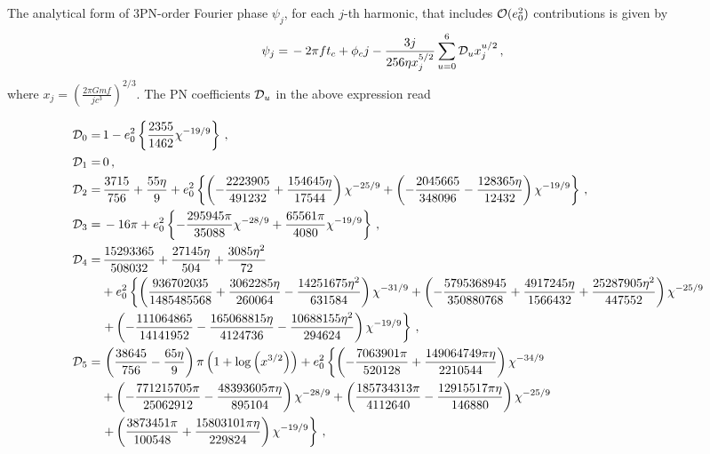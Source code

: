 \documentclass[aps,prd,twocolumn,superscriptaddress,groupedaddress,nofootinbib,showpacs,eqsecnum,useAms]{revtex4-2}
\begin{document}
The analytical form of 3PN-order Fourier phase $\psi_{j}$, for each $j$-th harmonic, that includes ${\cal O}(e_0^2)$ contributions is given by
\label{eq:Ecch_psi_full}
\begin{align}
\psi_{j} =& \, -2 \pi  f t_c+\phi _c j - \frac{3 j}{256 \eta  x_{j}^{5/2}} \sum _{u=0}^6 {\cal D}_u x_j^{u/2}\,,
\end{align}
where $x_{j} = \left( \frac{2 \pi G m f}{jc^3} \right)^{2/3}$. The PN coefficients ${\cal D}_u$ in the above expression read
\begin{widetext}
\begin{subequations}
\begin{align}
{\cal D}_0=& \, 1- e_0^2 \left\{ \frac{2355}{1462} \chi^{-19/9}\right\}\,, \\
{\cal D}_1=& \, 0\,, \\
{\cal D}_2=& \, \frac{3715}{756} + \frac{55 \eta}{9} + e_0^2 \left\{ \left( -\frac{2223905}{491232} + \frac{154645 \eta}{17544} \right) \chi^{-25/9} + \left( -\frac{2045665}{348096} - \frac{128365 \eta}{12432} \right) \chi^{-19/9} \right\} \,, \\ 
{\cal D}_3=& \, -16 \pi + e_0^2 \left\{ -\frac{295945 \pi}{35088} \chi^{-28/9} + \frac{65561 \pi}{4080} \chi^{-19/9} \right\} \,, \\
{\cal D}_4=& \, \frac{15293365}{508032} + \frac{27145 \eta}{504} + \frac{3085 \eta^2}{72} \notag \\
&+ e_0^2 \left\{ \left( \frac{936702035}{1485485568} + \frac{3062285 \eta}{260064} - \frac{14251675 \eta^2}{631584} \right) \chi^{-31/9} + \left( -\frac{5795368945}{350880768} + \frac{4917245 \eta}{1566432} + \frac{25287905 \eta^2}{447552} \right) \chi^{-25/9} \right. \notag \\
&\left. + \left( -\frac{111064865}{14141952} - \frac{165068815 \eta}{4124736} - \frac{10688155 \eta^2}{294624} \right) \chi^{-19/9} \right\} \,,  \\
{\cal D}_5=& \, \left( \frac{38645}{756} - \frac{65 \eta}{9} \right) \pi \left( 1 + \log\left(x^{3/2}\right) \right) + e_0^2 \left\{ \left( -\frac{7063901 \pi}{520128} + \frac{149064749 \pi \eta}{2210544} \right) \chi^{-34/9} \right. \notag \\
& + \left( -\frac{771215705 \pi}{25062912} - \frac{48393605 \pi \eta}{895104} \right) \chi^{-28/9} + \left( \frac{185734313 \pi}{4112640} - \frac{12915517 \pi \eta}{146880} \right) \chi^{-25/9} \notag \\
&\left. + \left( \frac{3873451 \pi}{100548} + \frac{15803101 \pi \eta}{229824} \right) \chi^{-19/9} \right\} \,,\\

\end{align}
\end{subequations}
\end{widetext}
\end{document}
